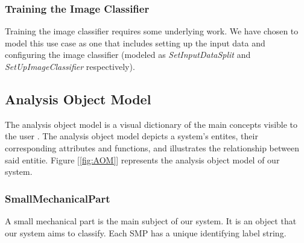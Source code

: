 \documentclass[a4paper,12pt,twoside]{report}
\begin{document}
\clearpage
\subsubsection{Training the Image Classifier}

Training the image classifier requires some underlying work. We have chosen to model this use case as one that includes setting up the input data and configuring the image classifier (modeled as \textit{SetInputDataSplit} and \textit{SetUpImageClassifier} respectively).

\begin{usecase}




\end{usecase}

\clearpage
\subsection{Analysis Object Model}

The analysis object model is a visual dictionary of the main concepts visible to the user \cite{bruegge2004object}. The analysis object model depicts a system's entites, their corresponding attributes and functions, and illustrates the relationship between said entitie. Figure [\ref{fig:AOM}] represents the analysis object model of our system.

\subsubsection{SmallMechanicalPart}
A small mechanical part is the main subject of our system. It is an object that our system aims to classify. Each SMP has a unique identifying label string.
\end{document}
